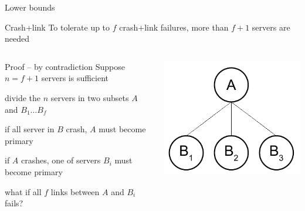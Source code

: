 \begin{frame}{Lower bounds}
	
\begin{block}{Crash+link}
To tolerate up to $f$ crash+link failures, more than $f+1$ servers are
needed
\end{block}

\begin{columns}
\begin{column}{0.6\textwidth}
\begin{block}{Proof -- by contradiction}
Suppose $n=f+1$ servers is sufficient
\BI
\item divide the $n$ servers in two subsets $A$ and $B_1 \ldots B_f$
\item if all server in $B$ crash, $A$ must become primary
\item if $A$ crashes, one of servers $B_i$ must become primary
\item what if all $f$ links between $A$ and $B_i$ fails?
\EI
\end{block}
\end{column}
\hfill
\begin{column}{0.30\textwidth}
\includegraphics[width=\textwidth]{lowerbound}
\end{column}
\end{columns}

\end{frame}

